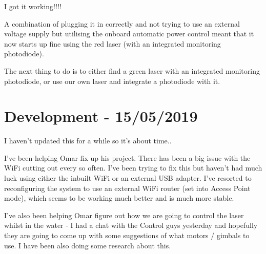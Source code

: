 I got it working!!!!

A combination of plugging it in correctly and not trying to use an external
voltage supply but utilising the onboard automatic power control meant that
it now starts up fine using the red laser (with an integrated monitoring
photodiode).

The next thing to do is to either find a green laser with an integrated
monitoring photodiode, or use our own laser and integrate a photodiode with
it.

\section{Development - 15/05/2019}
I haven't updated this for a while so it's about time..

I've been helping Omar fix up his project. There has been a big issue with
the WiFi cutting out every so often. I've been trying to fix this but haven't
had much luck using either the inbuilt WiFi or an external USB adapter. I've
resorted to reconfiguring the system to use an external WiFi router (set into
Access Point mode), which seems to be working much better and is much more
stable.

I've also been helping Omar figure out how we are going to control the laser
whilst in the water - I had a chat with the Control guys yesterday and hopefully
they are going to come up with some suggestions of what motors / gimbals to use.
I have been also doing some research about this.